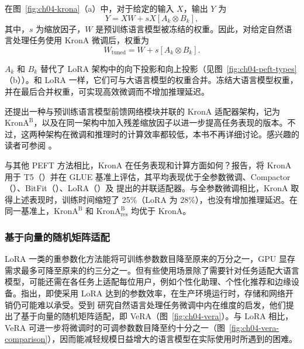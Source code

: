 在图~\ref{fig:ch04-krona}（a）中，对于给定的输入 $X$，输出 $Y$ 为
\begin{equation}
Y=XW+sX[A_k\otimes B_k],
\label{eq:ch04-krona-output}
\end{equation}
其中，$s$ 为缩放因子，$W$ 是预训练语言模型被冻结的权重。因此，对给定自然语言处理任务使用 KronA 微调后，权重为
\begin{equation}
W_{\mathrm{tuned}}=W+s[A_k\otimes B_k].
\label{eq:ch04-krona-weights}
\end{equation}


$A_k$ 和 $B_k$ 替代了 LoRA 架构中的向下投影和向上投影（见图~\ref{fig:ch04-peft-types}（b））。和 LoRA 一样，它们可与大语言模型的权重合并。冻结大语言模型权重，并在最后合并权重，可实现高效微调而不增加推理延迟。

还提出一种与预训练语言模型前馈网络模块并联的 KronA 适配器架构，记为 $\mathrm{KronA}^{\mathrm B}$，以及在同一架构中加入残差缩放因子以进一步提高任务表现的版本。不过，这两种架构在微调和推理时的计算效率都较低，本书不再详细讨论。感兴趣的读者可参阅 。

与其他 PEFT 方法相比，KronA 在任务表现和计算方面如何？报告，将 KronA 用于 T5（）并在 GLUE 基准上评估，其平均表现优于全参数微调、Compactor（）、BitFit（）、LoRA（）及 提出的并联适配器。与全参数微调相比，KronA 取得上述表现时，训练时间缩短了 25\%（LoRA 为 28\%），也没有增加推理延迟。在同一基准上，$\mathrm{KronA}^{\mathrm B}$ 和 $\mathrm{KronA}^{\mathrm B}_{\mathrm{res}}$ 均优于 KronA。

\subsubsection{基于向量的随机矩阵适配}
LoRA 一类的重参数化方法能将可训练参数数目降至原来的万分之一，GPU 显存需求最多可降至原来的约三分之一。但有些使用场景除了需要针对任务适配大语言模型，可能还需在各任务上适配每位用户，例如个性化助理、个性化推荐和边缘设备。指出，即使采用 LoRA 达到的参数效率，在生产环境运行时，存储和网络开销仍可能难以承受。受到 研究自然语言处理任务微调中内在维度的启发，他们提出了基于向量的随机矩阵适配，即 VeRA（图~\ref{fig:ch04-vera}）。与 LoRA 相比，VeRA 可进一步将微调时的可调参数数目降至约十分之一（图~\ref{fig:ch04-vera-comparison}），因而能减轻规模日益增大的语言模型在实际使用时所遇到的困难。

